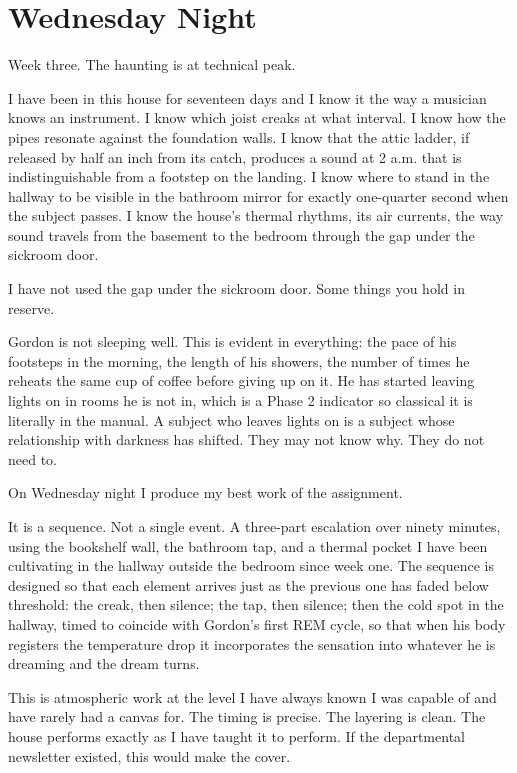 
\chapter{Wednesday Night}

Week three. The haunting is at technical peak.

I have been in this house for seventeen days and I know it the way a musician knows an instrument. I know which joist creaks at what interval. I know how the pipes resonate against the foundation walls. I know that the attic ladder, if released by half an inch from its catch, produces a sound at 2 a.m. that is indistinguishable from a footstep on the landing. I know where to stand in the hallway to be visible in the bathroom mirror for exactly one-quarter second when the subject passes. I know the house's thermal rhythms, its air currents, the way sound travels from the basement to the bedroom through the gap under the sickroom door.

I have not used the gap under the sickroom door. Some things you hold in reserve.

Gordon is not sleeping well. This is evident in everything: the pace of his footsteps in the morning, the length of his showers, the number of times he reheats the same cup of coffee before giving up on it. He has started leaving lights on in rooms he is not in, which is a Phase 2 indicator so classical it is literally in the manual. A subject who leaves lights on is a subject whose relationship with darkness has shifted. They may not know why. They do not need to.

On Wednesday night I produce my best work of the assignment.

It is a sequence. Not a single event. A three-part escalation over ninety minutes, using the bookshelf wall, the bathroom tap, and a thermal pocket I have been cultivating in the hallway outside the bedroom since week one. The sequence is designed so that each element arrives just as the previous one has faded below threshold: the creak, then silence; the tap, then silence; then the cold spot in the hallway, timed to coincide with Gordon's first REM cycle, so that when his body registers the temperature drop it incorporates the sensation into whatever he is dreaming and the dream turns.

This is atmospheric work at the level I have always known I was capable of and have rarely had a canvas for. The timing is precise. The layering is clean. The house performs exactly as I have taught it to perform. If the departmental newsletter existed, this would make the cover.

